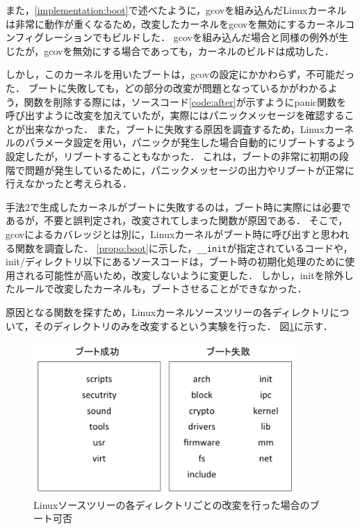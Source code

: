 \documentclass[graduation-thesis]{mlarticle}
\begin{document}
また，\ref{implementation:boot}で述べたように，gcovを組み込んだLinuxカーネルは非常に動作が重くなるため，改変したカーネルをgcovを無効にするカーネルコンフィグレーションでもビルドした．
gcovを組み込んだ場合と同様の例外が生じたが，gcovを無効にする場合であっても，カーネルのビルドは成功した．

しかし，このカーネルを用いたブートは，gcovの設定にかかわらず，不可能だった．
ブートに失敗しても，どの部分の改変が問題となっているかがわかるよう，関数を削除する際には，ソースコード\ref{code:after}が示すようにpanic関数を呼び出すように改変を加えていたが，実際にはパニックメッセージを確認することが出来なかった．
また，ブートに失敗する原因を調査するため，Linuxカーネルのパラメータ設定を用い，パニックが発生した場合自動的にリブートするよう設定したが，リブートすることもなかった．
これは，ブートの非常に初期の段階で問題が発生しているために，パニックメッセージの出力やリブートが正常に行えなかったと考えられる．

手法2で生成したカーネルがブートに失敗するのは，ブート時に実際には必要であるが，不要と誤判定され，改変されてしまった関数が原因である．
そこで，gcovによるカバレッジとは別に，Linuxカーネルがブート時に呼び出すと思われる関数を調査した．
\ref{propo:boot}に示した，\texttt{\_\_init}が指定されているコードや，init/ディレクトリ以下にあるソースコードは，ブート時の初期化処理のために使用される可能性が高いため，改変しないように変更した．
しかし，initを除外したルールで改変したカーネルも，ブートさせることができなかった．

原因となる関数を探すため，Linuxカーネルソースツリーの各ディレクトリについて，そのディレクトリのみを改変するという実験を行った．
図\ref{fig:directory}に示す．

\begin{figure}[H]
  \begin{center}
    \includegraphics[width=10.0cm]{images/boottest.png}
    \caption{Linuxソースツリーの各ディレクトリごとの改変を行った場合のブート可否}
    \label{fig:directory}
  \end{center}
\end{figure}
\end{document}

